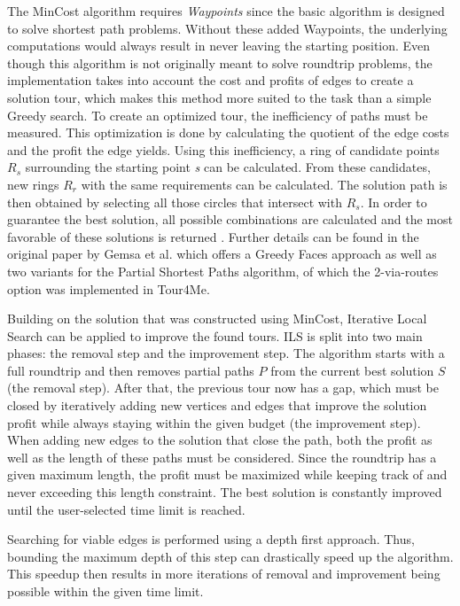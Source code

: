 The MinCost algorithm \cite{buchin_tour4me_2022, gemsa_efficient_2013} requires \textit{Waypoints} since the basic algorithm is designed to solve shortest path problems. 
Without these added Waypoints, the underlying computations would always result in never leaving the starting position. 
Even though this algorithm is not originally meant to solve roundtrip problems, the implementation takes into account the cost and profits of edges to create a solution tour, which makes this method more suited to the task than a simple Greedy search.
To create an optimized tour, the inefficiency of paths must be measured. 
This optimization is done by calculating the quotient of the edge costs and the profit the edge yields. 
Using this inefficiency, a ring of candidate points $R_s$ surrounding the starting point \textit{s} can be calculated.
From these candidates, new rings $R_r$ with the same requirements can be calculated. 
The solution path is then obtained by selecting all those circles that intersect with $R_s$.
In order to guarantee the best solution, all possible combinations are calculated and the most favorable of these solutions is returned \cite{buchin_tour4me_2022}.
Further details can be found in the original paper by Gemsa et al. \cite{gemsa_efficient_2013} which offers a Greedy Faces approach as well as two variants for the Partial Shortest Paths algorithm, of which the 2-via-routes option was implemented in Tour4Me.

Building on the solution that was constructed using MinCost, Iterative Local Search \cite{buchin_tour4me_2022, lu_arc_2015, verbeeck_extension_2014} can be applied to improve the found tours.
ILS is split into two main phases: the removal step and the improvement step.
The algorithm starts with a full roundtrip and then removes partial paths $P$ from the current best solution $S$ (the removal step).
After that, the previous tour now has a gap, which must be closed by iteratively adding new vertices and edges that improve the solution profit while always staying within the given budget (the improvement step).
When adding new edges to the solution that close the path, both the profit as well as the length of these paths must be considered. 
Since the roundtrip has a given maximum length, the profit must be maximized while keeping track of and never exceeding this length constraint.
The best solution is constantly improved until the user-selected time limit is reached.

Searching for viable edges is performed using a depth first approach.
Thus, bounding the maximum depth of this step can drastically speed up the algorithm.
This speedup then results in more iterations of removal and improvement being possible within the given time limit.



